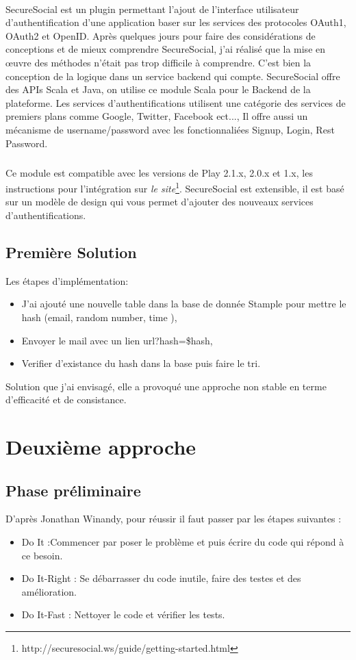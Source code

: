 \paragraph{}
SecureSocial est un plugin permettant l'ajout de l'interface utilisateur d'authentification d'une application baser sur les services des protocoles OAuth1, OAuth2 et OpenID.
Après quelques jours pour faire des considérations de conceptions et de mieux comprendre SecureSocial, j'ai réalisé que la mise en œuvre des méthodes n'était pas trop difficile à comprendre. C'est bien la conception de la logique dans un service backend qui compte. 
SecureSocial offre des APIs Scala et Java, on utilise ce module Scala pour le Backend de la plateforme.
Les services d'authentifications utilisent une catégorie des services de premiers plans comme Google, Twitter, Facebook ect..., Il offre aussi un mécanisme de username/password avec les fonctionnaliées Signup, Login, Rest Password.
\subparagraph{}
Ce module est compatible avec les versions de Play 2.1.x, 2.0.x et 1.x, les instructions pour l'intégration sur \textit{le site}\footnote{http://securesocial.ws/guide/getting-started.html}.
SecureSocial est extensible, il est basé sur un modèle de design qui vous permet d'ajouter des nouveaux services d'authentifications.

\subsection{Première Solution}
Les étapes d'implémentation: 
\begin{itemize}
\item J'ai ajouté une nouvelle table dans la base de donnée Stample pour mettre le hash (email, random number, time ),
\item Envoyer le mail avec un lien url?hash=\$hash,
\item Verifier d'existance du hash dans la base puis faire le tri.

\end{itemize}
Solution que j'ai envisagé, elle a provoqué une approche non stable en terme d'efficacité et de consistance.
\section{Deuxième approche}
\subsection{Phase préliminaire}
D'après Jonathan Winandy, pour réussir il faut passer par les étapes suivantes :
\begin{itemize}

\item Do It :Commencer par poser le problème et puis écrire du code qui répond à ce besoin.  
\item Do It-Right : Se débarrasser du code inutile, faire des testes et des amélioration.
\item Do It-Fast : Nettoyer le code et vérifier les tests.
\end{itemize}

